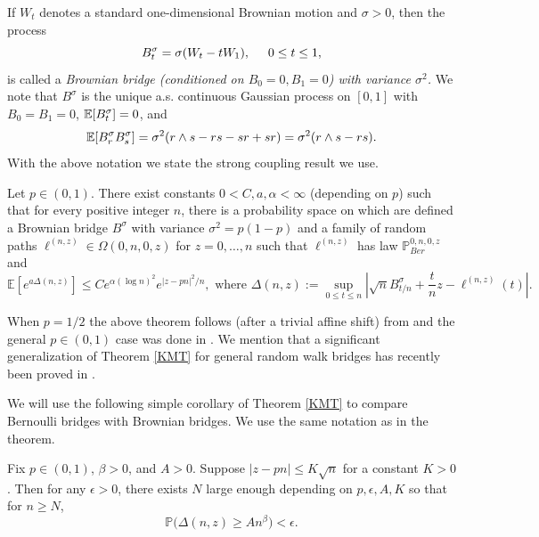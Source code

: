 If $W_t$ denotes a standard one-dimensional Brownian motion and $\sigma > 0$, then the process
$$B^{\sigma}_t = \sigma (W_t - t W_1), \hspace{5mm} 0 \leq t \leq 1,$$
is called a {\em Brownian bridge (conditioned on $B_0 = 0, B_1 = 0$) with variance $\sigma^2$.} We note that $B^\sigma$ is the unique a.s. continuous Gaussian process on $[0,1]$ with $B_0 = B_1  = 0$, $\mathbb{E}[B^\sigma_t] = 0$, and
\begin{equation}\label{BBcovar}
\mathbb{E}[B^\sigma_r B^\sigma_s] = \sigma^2(r\wedge s - rs - sr + sr) = \sigma^2 (r\wedge s - rs).
\end{equation}  
With the above notation we state the strong coupling result we use.
\begin{theorem}\label{KMT}
Let $p \in (0,1)$. There exist constants $0 < C, a, \alpha < \infty$ (depending on $p$) such that for every positive integer $n$, there is a probability space on which are defined a Brownian bridge $B^\sigma$ with variance $\sigma^2 = p(1-p)$ and a family of random paths $\ell^{(n,z)} \in \Omega(0,n, 0, z)$ for $z = 0,\dots,n$ such that $\ell^{(n,z)}$ has law $\mathbb{P}^{0,n,0,z}_{Ber}$ and
\begin{equation}\label{KMTeq}
\mathbb{E}\left[ e^{a \Delta(n,z)} \right] \leq C e^{\alpha (\log n)^2}e^{|z- p n|^2/n}, \mbox{ where $\Delta(n,z):=  \sup_{0 \leq t \leq n} \left| \sqrt{n} B^\sigma_{t/n} + \frac{t}{n}z - \ell^{(n,z)}(t) \right|.$}
\end{equation}
\end{theorem}
\begin{remark} When $p = 1/2$ the above theorem follows (after a trivial affine shift) from \cite[Theorem 6.3]{LF} and the general $p \in (0,1)$ case was done in \cite[Theorem 4.5]{CD}. We mention that a significant generalization of Theorem \ref{KMT} for general random walk bridges has recently been proved in \cite[Theorem 2.3]{DW19}.
\end{remark}

We will use the following simple corollary of Theorem \ref{KMT} to compare Bernoulli bridges with Brownian bridges. We use the same notation as in the theorem.

\begin{corollary}\label{Cheb}
	Fix $p\in (0,1)$, $\beta > 0$, and $A>0$. Suppose $|z-pn| \leq K\sqrt{n}$ for a constant $K>0$. Then for any $\epsilon > 0$, there exists $N$ large enough depending on $p,\epsilon,A,K$ so that for $n\geq N$,
	\[
	\mathbb{P}\Big(\Delta(n,z) \geq An^\beta\Big) < \epsilon.
	\]
\end{corollary}

